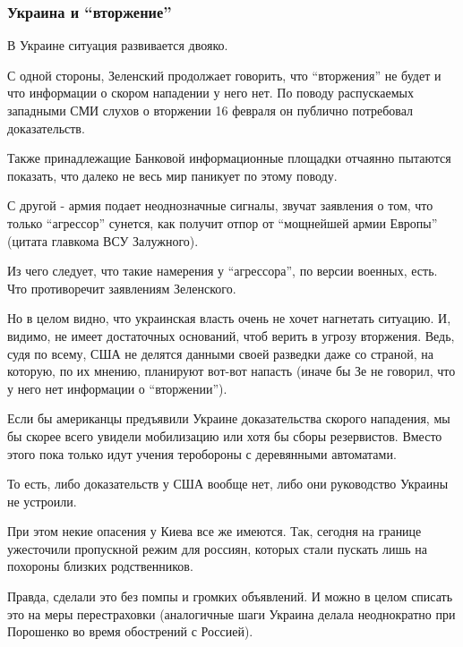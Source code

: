  
 
 
 
 

\subsubsection{Украина и \enquote{вторжение}}
\label{sec:13_02_2022.stz.news.ua.strana.1.vozduh_blokada.3.ukraina_vtorzhenie}

В Украине ситуация развивается двояко. 

С одной стороны, Зеленский продолжает говорить, что \enquote{вторжения} не
будет и что информации о скором нападении у него нет. По поводу распускаемых
западными СМИ слухов о вторжении 16 февраля он публично потребовал
доказательств.

Также принадлежащие Банковой информационные площадки отчаянно пытаются
показать, что далеко не весь мир паникует по этому поводу. 

С другой - армия подает неоднозначные сигналы, звучат заявления о том, что
только \enquote{агрессор} сунется, как получит отпор от \enquote{мощнейшей
армии Европы} (цитата главкома ВСУ Залужного). 

Из чего следует, что такие намерения у \enquote{агрессора}, по версии военных,
есть. Что противоречит заявлениям Зеленского. 

Но в целом видно, что украинская власть очень не хочет нагнетать ситуацию. И,
видимо, не имеет достаточных оснований, чтоб верить в угрозу вторжения. Ведь,
судя по всему, США не делятся данными своей разведки даже со страной, на
которую, по их мнению, планируют вот-вот напасть (иначе бы Зе не говорил, что у
него нет информации о \enquote{вторжении}). 

Если бы американцы предъявили Украине доказательства скорого нападения, мы бы
скорее всего увидели мобилизацию или хотя бы сборы резервистов. Вместо этого
пока только идут учения теробороны с деревянными автоматами. 

То есть, либо доказательств у США вообще нет, либо они руководство Украины не
устроили. 

При этом некие опасения у Киева все же имеются. Так, сегодня на границе
ужесточили пропускной режим для россиян, которых стали пускать лишь на похороны
близких родственников.

Правда, сделали это без помпы и громких объявлений. И можно в целом списать это
на меры перестраховки (аналогичные шаги Украина делала неоднократно при
Порошенко во время обострений с Россией). 

